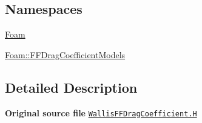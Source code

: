 \subsection*{Namespaces}
\begin{DoxyCompactItemize}
\item 
 \hyperlink{namespaceFoam}{Foam}
\item 
 \hyperlink{namespaceFoam_1_1FFDragCoefficientModels}{Foam\+::\+F\+F\+Drag\+Coefficient\+Models}
\end{DoxyCompactItemize}


\subsection{Detailed Description}
{\bfseries Original source file} \href{../../../home/carlo/data/GeN-Foam/GeN-Foam_ffn/GeN-Foam/GeN-Foam/classes/thermalHydraulics/src/physicsModels/dragModels/FFDragCoefficientModels/Wallis/WallisFFDragCoefficient.H}{\tt Wallis\+F\+F\+Drag\+Coefficient.\+H} 